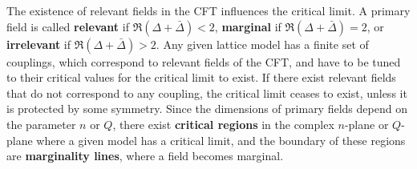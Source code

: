 \documentclass[12pt, a4paper]{article}
\newcommand{\myindex}[1]{\textbf{\boldmath #1}}
\begin{document}
The existence of relevant fields in the CFT influences the critical limit. A primary field is called \myindex{relevant} if $\Re(\Delta+\bar\Delta)<2$, \myindex{marginal} if $\Re(\Delta+\bar\Delta)=2$, or \myindex{irrelevant} if $\Re(\Delta+\bar\Delta)>2$. 
Any given lattice model has a finite set of couplings, which correspond to relevant fields of the CFT, and have to be tuned to their critical values for the critical limit to exist. If there exist relevant fields that do not correspond to any coupling, the critical limit ceases to exist, unless it is protected by some symmetry. Since the 
dimensions of primary fields depend on the parameter $n$ or $Q$, there exist \myindex{critical regions} in the complex $n$-plane or $Q$-plane where a given model has a critical limit, and the boundary of these regions are \myindex{marginality lines}, where a field becomes marginal. 
\end{document}
